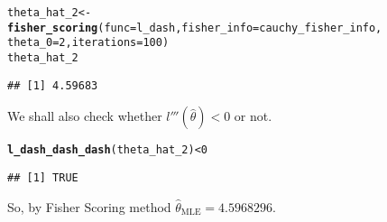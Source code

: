 \documentclass[11pt, a4paper]{article}\usepackage[]{graphicx}\usepackage[]{xcolor}
\makeatletter
\newcommand{\hlnum}[1]{\textcolor[rgb]{0.686,0.059,0.569}{#1}}%
\newcommand{\hlopt}[1]{\textcolor[rgb]{0,0,0}{#1}}%
\newcommand{\hldef}[1]{\textcolor[rgb]{0.345,0.345,0.345}{#1}}%
\newcommand{\hlkwb}[1]{\textcolor[rgb]{0.69,0.353,0.396}{#1}}%
\newcommand{\hlkwc}[1]{\textcolor[rgb]{0.333,0.667,0.333}{#1}}%
\newcommand{\hlkwd}[1]{\textcolor[rgb]{0.737,0.353,0.396}{\textbf{#1}}}%
\newenvironment{kframe}{%
 \def\at@end@of@kframe{}%
 \ifinner\ifhmode%
  \def\at@end@of@kframe{\end{minipage}}%
  \begin{minipage}{\columnwidth}%
 \fi\fi%
 \def\FrameCommand##1{\hskip\@totalleftmargin \hskip-\fboxsep
 \colorbox{shadecolor}{##1}\hskip-\fboxsep
     \hskip-\linewidth \hskip-\@totalleftmargin \hskip\columnwidth}%
 \MakeFramed {\advance\hsize-\width
   \@totalleftmargin\z@ \linewidth\hsize
   \@setminipage}}%
 {\par\unskip\endMakeFramed%
 \at@end@of@kframe}
\newenvironment{knitrout}{}{} %
\makeatother
\begin{document}
\begin{knitrout}
\color{fgcolor}\begin{kframe}
\begin{alltt}
\hldef{theta_hat_2} \hlkwb{<-} \hlkwd{fisher_scoring}\hldef{(}\hlkwc{func} \hldef{= l_dash,} \hlkwc{fisher_info} \hldef{= cauchy_fisher_info,}
                              \hlkwc{theta_0} \hldef{=} \hlnum{2}\hldef{,} \hlkwc{iterations} \hldef{=} \hlnum{100}\hldef{)}
\hldef{theta_hat_2}
\end{alltt}
\begin{verbatim}
## [1] 4.59683
\end{verbatim}
\end{kframe}
\end{knitrout}

We shall also check whether $l'''(\hat{\theta}) < 0$ or not.

\begin{knitrout}
\color{fgcolor}\begin{kframe}
\begin{alltt}
\hlkwd{l_dash_dash_dash}\hldef{(theta_hat_2)} \hlopt{<} \hlnum{0}
\end{alltt}
\begin{verbatim}
## [1] TRUE
\end{verbatim}
\end{kframe}
\end{knitrout}

So, by Fisher Scoring method $\hat{\theta}_{\text{MLE}} = 4.5968296$. \\
\end{document}
